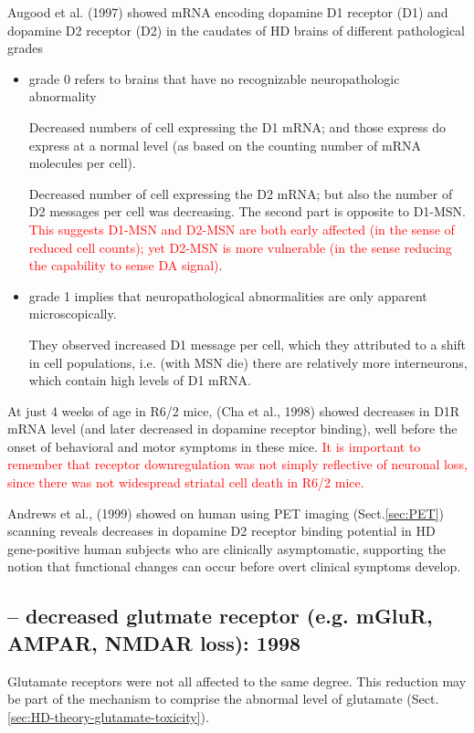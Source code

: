 Augood et al. (1997) showed mRNA encoding dopamine D1 receptor (D1) and dopamine
D2 receptor (D2) in the caudates of HD brains of different pathological grades
\begin{itemize}
  \item  grade 0 refers to brains that have no recognizable neuropathologic
  abnormality

Decreased numbers of cell expressing the D1 mRNA; and those express do express
at a normal level (as based on the counting number of mRNA molecules per cell).

Decreased number of cell expressing the D2 mRNA; but also the
number of D2 messages per cell was decreasing. The second part is opposite to
D1-MSN. \textcolor{red}{This suggests D1-MSN and D2-MSN are both early
affected (in the sense of reduced cell counts); yet D2-MSN is more vulnerable
(in the sense reducing the capability to sense DA signal)}.
  
  \item grade 1 implies that neuropathological abnormalities are only apparent
  microscopically.
  
  
They observed increased D1 message per cell, which they attributed to a shift in
cell populations, i.e. (with MSN die) there are relatively more interneurons,
which contain high levels of D1 mRNA.
  
\end{itemize}

At just 4 weeks of age in R6/2 mice, (Cha et al., 1998) showed decreases in D1R
mRNA level (and later decreased in dopamine receptor binding), well before the
onset of behavioral and motor symptoms in these mice.
\textcolor{red}{It is important to remember that receptor downregulation was not
simply reflective of neuronal loss, since there was not widespread striatal cell
death in R6/2 mice.}

Andrews et al., (1999) showed on human using PET imaging (Sect.\ref{sec:PET})
scanning reveals decreases in dopamine D2 receptor binding potential in HD
gene-positive human subjects who are clinically asymptomatic, supporting the
notion that functional changes can occur before overt clinical symptoms develop.

\subsection{-- decreased glutmate receptor (e.g. mGluR, AMPAR, NMDAR loss):
1998}

Glutamate receptors were not all affected to the same degree.
This reduction may be part of the mechanism to comprise the abnormal level of
glutamate (Sect.\ref{sec:HD-theory-glutamate-toxicity}).

